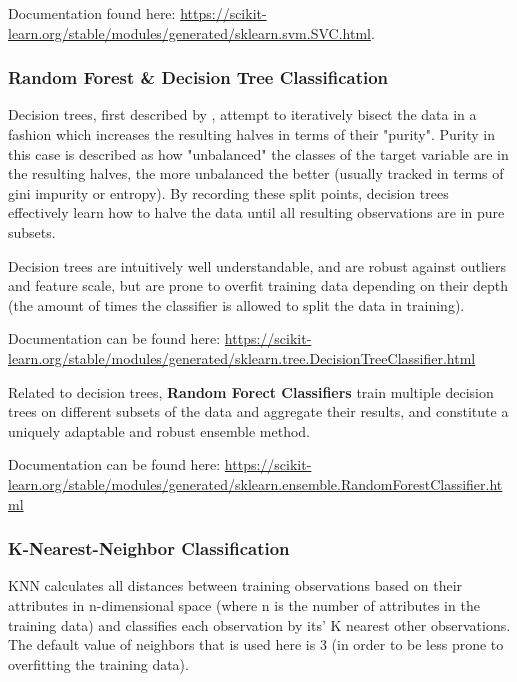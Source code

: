 Documentation found here: \url{https://scikit-learn.org/stable/modules/generated/sklearn.svm.SVC.html}.
 
\clearpage

\subsubsection{Random Forest \& Decision Tree Classification}

Decision trees, first described by \cite{quinlan1986induction}, attempt to iteratively bisect the data in a fashion which increases the resulting halves in terms of their "purity".
Purity in this case is described as how "unbalanced" the classes of the target variable are in the resulting halves, the more unbalanced the better (usually tracked in terms of gini impurity or entropy). 
By recording these split points, decision trees effectively learn how to halve the data until all resulting observations are in pure subsets. 

Decision trees are intuitively well understandable, and are robust against outliers and feature scale, 
but are prone to overfit training data depending on their depth (the amount of times the classifier is allowed to split the data in training).

Documentation can be found here: \url{https://scikit-learn.org/stable/modules/generated/sklearn.tree.DecisionTreeClassifier.html}

Related to decision trees, \textbf{Random Forect Classifiers} train multiple decision trees on different subsets of the data and aggregate their results, and constitute a uniquely adaptable and robust ensemble method.

Documentation can be found here: \url{https://scikit-learn.org/stable/modules/generated/sklearn.ensemble.RandomForestClassifier.html}

\clearpage

\subsubsection{K-Nearest-Neighbor Classification}

\ac{KNN} calculates all distances between training observations based on their attributes in n-dimensional space (where n is the number of attributes in the training data) 
and classifies each observation by its' K nearest other observations. The default value of neighbors that is used here is 3 (in order to be less prone to overfitting the training data).

